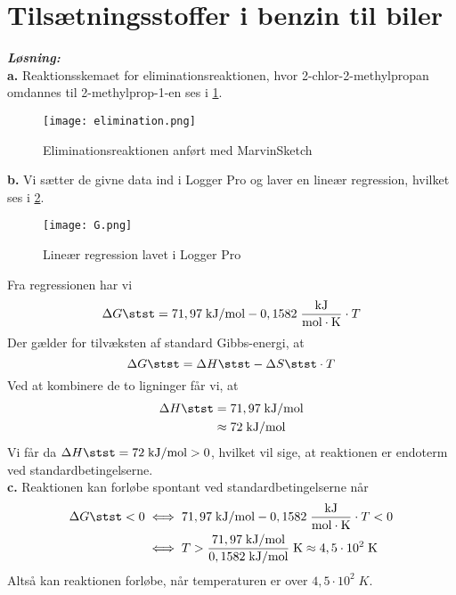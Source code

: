 \documentclass{report}
\newcommand{\sol}{\setlength{\parindent}{0cm}\textbf{\textit{Løsning:}}\setlength{\parindent}{1cm}}
\begin{document}
\section*{Tilsætningsstoffer i benzin til biler}
\sol \\
\textbf{a.}
Reaktionsskemaet for eliminationsreaktionen, hvor 2-chlor-2-methylpropan omdannes til 2-methylprop-1-en ses i \cref{fig:elimination}.
\begin{figure}[H]
\begin{center}
  \texttt{[image: elimination.png]}
\end{center}
\caption{Eliminationsreaktionen anført med MarvinSketch}
\label{fig:elimination}
\end{figure}
\noindent \textbf{b.}
Vi sætter de givne data ind i Logger Pro og laver en lineær regression, hvilket ses i \cref{fig:G}.
\begin{figure}[H]
\begin{center}
  \texttt{[image: G.png]}
\end{center}
\caption{Lineær regression lavet i Logger Pro}
\label{fig:G}
\end{figure}
Fra regressionen har vi
\[
\Delta G \stst =71,97 \;\unit{kJ/mol} -0,1582 \;\unit{\frac{kJ}{mol \cdot K}} \cdot T
\] 
Der gælder for tilvæksten af standard Gibbs-energi, at
\[
\Delta G \stst =\Delta H\stst - \Delta S\stst \cdot T 
\] 
Ved at kombinere de to ligninger får vi, at
\begin{equation*}
\begin{split}
  \Delta H\stst &=71,97 \;\unit{kJ/mol} \\
  &\approx 72 \;\unit{kJ/mol} 
\end{split}
\end{equation*}
Vi får da $\Delta H\stst=72 \;\unit{kJ/mol} >0$, hvilket vil sige, at reaktionen er endoterm ved standardbetingelserne.\\[1ex]
\textbf{c.}
Reaktionen kan forløbe spontant ved standardbetingelserne når 
\begin{equation*}
\begin{split}
  \Delta G \stst <0 &\iff 71,97 \;\unit{kJ/mol} -0,1582 \;\unit{\frac{kJ}{mol \cdot K}} \cdot T <0\\
  &\iff T >\frac{71,97 \;\unit{kJ/mol} }{0,1582 \;\unit{kJ/mol} } \;\unit{K} \approx 4,5 \cdot 10^2 \;\unit{K} 
\end{split}
\end{equation*}
Altså kan reaktionen forløbe, når temperaturen er over $4,5 \cdot 10^2 \;\unit{K} $.\\[1ex]
\end{document}
